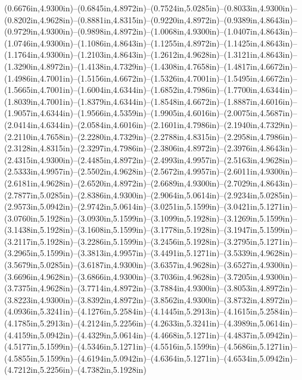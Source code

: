 (0.6676in,4.9300in)--(0.6845in,4.8972in)--(0.7524in,5.0285in)--(0.8033in,4.9300in)--(0.8202in,4.9628in)--(0.8881in,4.8315in)--(0.9220in,4.8972in)--(0.9389in,4.8643in)--(0.9729in,4.9300in)--(0.9898in,4.8972in)--(1.0068in,4.9300in)--(1.0407in,4.8643in)--(1.0746in,4.9300in)--(1.1086in,4.8643in)--(1.1255in,4.8972in)--(1.1425in,4.8643in)--(1.1764in,4.9300in)--(1.2103in,4.8643in)--(1.2612in,4.9628in)--(1.3121in,4.8643in)--(1.3290in,4.8972in)--(1.4138in,4.7329in)--(1.4308in,4.7658in)--(1.4817in,4.6672in)--(1.4986in,4.7001in)--(1.5156in,4.6672in)--(1.5326in,4.7001in)--(1.5495in,4.6672in)--(1.5665in,4.7001in)--(1.6004in,4.6344in)--(1.6852in,4.7986in)--(1.7700in,4.6344in)--(1.8039in,4.7001in)--(1.8379in,4.6344in)--(1.8548in,4.6672in)--(1.8887in,4.6016in)--(1.9057in,4.6344in)--(1.9566in,4.5359in)--(1.9905in,4.6016in)--(2.0075in,4.5687in)--(2.0414in,4.6344in)--(2.0584in,4.6016in)--(2.1601in,4.7986in)--(2.1940in,4.7329in)--(2.2110in,4.7658in)--(2.2280in,4.7329in)--(2.2788in,4.8315in)--(2.2958in,4.7986in)--(2.3128in,4.8315in)--(2.3297in,4.7986in)--(2.3806in,4.8972in)--(2.3976in,4.8643in)--(2.4315in,4.9300in)--(2.4485in,4.8972in)--(2.4993in,4.9957in)--(2.5163in,4.9628in)--(2.5333in,4.9957in)--(2.5502in,4.9628in)--(2.5672in,4.9957in)--(2.6011in,4.9300in)--(2.6181in,4.9628in)--(2.6520in,4.8972in)--(2.6689in,4.9300in)--(2.7029in,4.8643in)--(2.7877in,5.0285in)--(2.8386in,4.9300in)--(2.9064in,5.0614in)--(2.9234in,5.0285in)--(2.9573in,5.0942in)--(2.9742in,5.0614in)--(3.0251in,5.1599in)--(3.0421in,5.1271in)--(3.0760in,5.1928in)--(3.0930in,5.1599in)--(3.1099in,5.1928in)--(3.1269in,5.1599in)--(3.1438in,5.1928in)--(3.1608in,5.1599in)--(3.1778in,5.1928in)--(3.1947in,5.1599in)--(3.2117in,5.1928in)--(3.2286in,5.1599in)--(3.2456in,5.1928in)--(3.2795in,5.1271in)--(3.2965in,5.1599in)--(3.3813in,4.9957in)--(3.4491in,5.1271in)--(3.5339in,4.9628in)--(3.5679in,5.0285in)--(3.6187in,4.9300in)--(3.6357in,4.9628in)--(3.6527in,4.9300in)--(3.6696in,4.9628in)--(3.6866in,4.9300in)--(3.7036in,4.9628in)--(3.7205in,4.9300in)--(3.7375in,4.9628in)--(3.7714in,4.8972in)--(3.7884in,4.9300in)--(3.8053in,4.8972in)--(3.8223in,4.9300in)--(3.8392in,4.8972in)--(3.8562in,4.9300in)--(3.8732in,4.8972in)--(4.0936in,5.3241in)--(4.1276in,5.2584in)--(4.1445in,5.2913in)--(4.1615in,5.2584in)--(4.1785in,5.2913in)--(4.2124in,5.2256in)--(4.2633in,5.3241in)--(4.3989in,5.0614in)--(4.4159in,5.0942in)--(4.4329in,5.0614in)--(4.4668in,5.1271in)--(4.4837in,5.0942in)--(4.5177in,5.1599in)--(4.5346in,5.1271in)--(4.5516in,5.1599in)--(4.5686in,5.1271in)--(4.5855in,5.1599in)--(4.6194in,5.0942in)--(4.6364in,5.1271in)--(4.6534in,5.0942in)--(4.7212in,5.2256in)--(4.7382in,5.1928in) 
